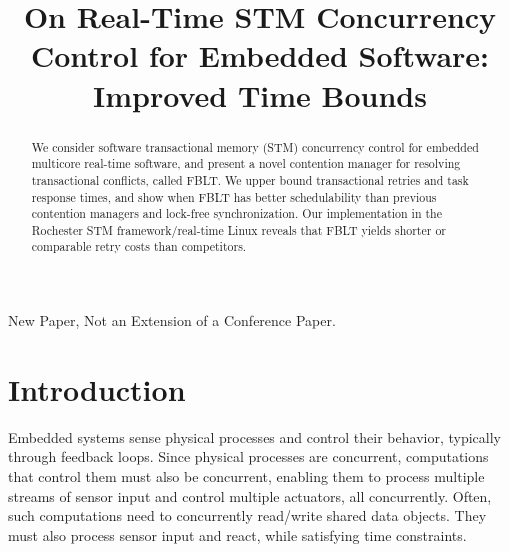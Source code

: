 \documentclass[prodmode,acmtecs]{acmsmall}
\begin{document}

\title{On Real-Time STM Concurrency Control for Embedded Software: Improved Time Bounds}
\author{
}

\begin{abstract}
We consider software transactional memory (STM) concurrency control for embedded multicore real-time software, and present a novel contention manager for resolving transactional conflicts, called FBLT. We upper bound transactional retries and task response times, and show when FBLT has better schedulability than previous contention managers and lock-free synchronization. Our implementation in the Rochester STM framework/real-time Linux reveals that FBLT yields shorter or comparable retry costs than competitors.
\end{abstract}




\acmformat{
}

\begin{bottomstuff}
New Paper, Not an Extension of a Conference Paper.\\
\end{bottomstuff}

\maketitle


\section{Introduction}

\label{sec:intro}

Embedded systems sense physical processes and control their behavior, typically through feedback loops. Since physical processes are concurrent, computations that control them must also be concurrent, enabling them to process multiple streams of sensor input and control multiple actuators, all concurrently. Often, such computations need to concurrently read/write shared data objects. They must also process sensor input and react, while satisfying time constraints. 
\end{document}

